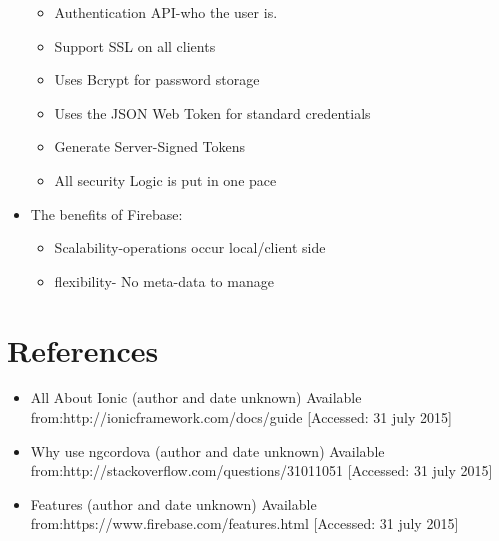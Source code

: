 \documentclass[a4paper,12pt]{article}
\begin{document}
\begin{itemize}
\begin{itemize}
\begin{itemize}
\end{itemize}
\item Authentication API-who the user is.
\item Support SSL on all clients
\item Uses Bcrypt for password storage
\item Uses the JSON Web Token for standard credentials
\item Generate Server-Signed Tokens
\item All security Logic is put in one pace
\end{itemize}
\item The benefits of Firebase:
\begin{itemize}
\item Scalability-operations occur local/client side
\item flexibility- No meta-data to manage
\end{itemize}
\end{itemize}

\section{References}
\begin{itemize}
\item All About Ionic (author and date unknown) 
Available from:http://ionicframework.com/docs/guide
[Accessed: 31 july 2015]
\item Why use ngcordova (author and date unknown) 
Available from:http://stackoverflow.com/questions/31011051
[Accessed: 31 july 2015]
\item Features  (author and date unknown) 
Available from:https://www.firebase.com/features.html 
[Accessed: 31 july 2015]
\end{itemize}
\end{document}

